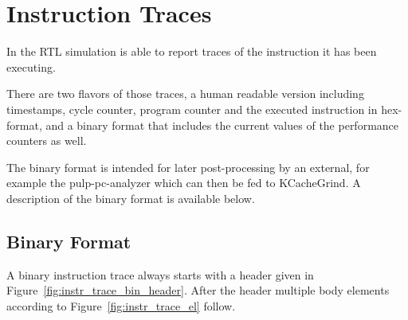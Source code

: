 \chapter{Instruction Traces}
In the RTL simulation \orion is able to report traces of the instruction it has
been executing.

There are two flavors of those traces, a human readable version including
timestamps, cycle counter, program counter and the executed instruction in
hex-format, and a binary format that includes the current values of the
performance counters as well.

The binary format is intended for later post-processing by an external, for
example the pulp-pc-analyzer which can then be fed to KCacheGrind.
A description of the binary format is available below.


\section{Binary Format}

A binary instruction trace always starts with a header given in
Figure~\ref{fig:instr_trace_bin_header}. After the header multiple body elements
according to Figure~\ref{fig:instr_trace_el} follow.

